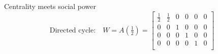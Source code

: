 \documentclass[10pt, aspectratio=169]{beamer}
\begin{document}
\begin{frame}[label=m-lemma,t]{Centrality meets social power}
{  \smallskip
%
%
  {\setlength{\arraycolsep}{4pt}\renewcommand{\arraystretch}{0.9}%
  \[ \text{Directed cycle:}\quad W = A(\tfrac12) = \begin{bmatrix}
       \frac12&\frac12&0&0&0&0\\ 0&0&1&0&0&0\\ 0&0&0&1&0&0\\ 0&0&0&0&1&0\\

\end{bmatrix}\]}}
\end{frame}
\end{document}
